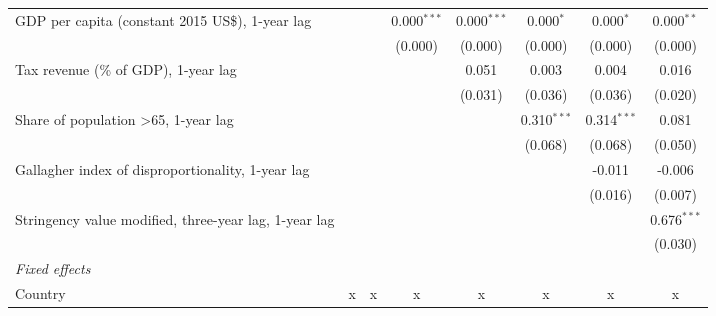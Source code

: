 \begin{tabular}{lccccccc}
   GDP per capita (constant 2015 US\$), 1-year lag                                           &         &         & 0.000$^{***}$ & 0.000$^{***}$ & 0.000$^{*}$   & 0.000$^{*}$   & 0.000$^{**}$\\   
                                                                                             &         &         & (0.000)       & (0.000)       & (0.000)       & (0.000)       & (0.000)\\   
   Tax revenue (\% of GDP), 1-year lag                                                       &         &         &               & 0.051         & 0.003         & 0.004         & 0.016\\   
                                                                                             &         &         &               & (0.031)       & (0.036)       & (0.036)       & (0.020)\\   
   Share of population >65, 1-year lag                                                       &         &         &               &               & 0.310$^{***}$ & 0.314$^{***}$ & 0.081\\   
                                                                                             &         &         &               &               & (0.068)       & (0.068)       & (0.050)\\   
   Gallagher index of disproportionality, 1-year lag                                         &         &         &               &               &               & -0.011        & -0.006\\   
                                                                                             &         &         &               &               &               & (0.016)       & (0.007)\\   
   Stringency value modified, three-year lag, 1-year lag                                     &         &         &               &               &               &               & 0.676$^{***}$\\   
                                                                                             &         &         &               &               &               &               & (0.030)\\   
   \emph{Fixed effects}\\
   Country                                                                                   & x       & x       & x             & x             & x             & x             & x\\  

\end{tabular}
